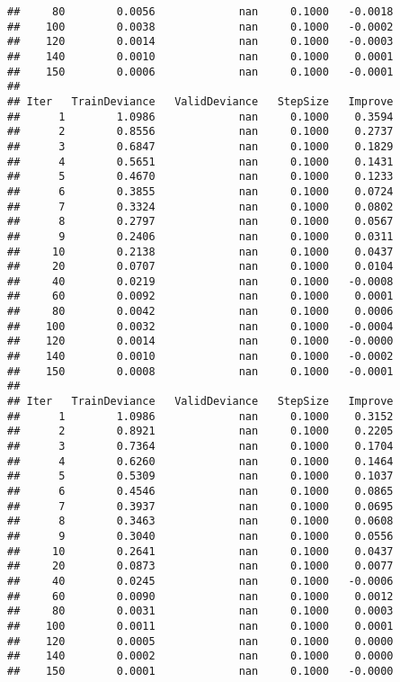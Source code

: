 \documentclass[
]{article}
\begin{document}
\begin{verbatim}
##     80        0.0056             nan     0.1000   -0.0018
##    100        0.0038             nan     0.1000   -0.0002
##    120        0.0014             nan     0.1000   -0.0003
##    140        0.0010             nan     0.1000    0.0001
##    150        0.0006             nan     0.1000   -0.0001
## 
## Iter   TrainDeviance   ValidDeviance   StepSize   Improve
##      1        1.0986             nan     0.1000    0.3594
##      2        0.8556             nan     0.1000    0.2737
##      3        0.6847             nan     0.1000    0.1829
##      4        0.5651             nan     0.1000    0.1431
##      5        0.4670             nan     0.1000    0.1233
##      6        0.3855             nan     0.1000    0.0724
##      7        0.3324             nan     0.1000    0.0802
##      8        0.2797             nan     0.1000    0.0567
##      9        0.2406             nan     0.1000    0.0311
##     10        0.2138             nan     0.1000    0.0437
##     20        0.0707             nan     0.1000    0.0104
##     40        0.0219             nan     0.1000   -0.0008
##     60        0.0092             nan     0.1000    0.0001
##     80        0.0042             nan     0.1000    0.0006
##    100        0.0032             nan     0.1000   -0.0004
##    120        0.0014             nan     0.1000   -0.0000
##    140        0.0010             nan     0.1000   -0.0002
##    150        0.0008             nan     0.1000   -0.0001
## 
## Iter   TrainDeviance   ValidDeviance   StepSize   Improve
##      1        1.0986             nan     0.1000    0.3152
##      2        0.8921             nan     0.1000    0.2205
##      3        0.7364             nan     0.1000    0.1704
##      4        0.6260             nan     0.1000    0.1464
##      5        0.5309             nan     0.1000    0.1037
##      6        0.4546             nan     0.1000    0.0865
##      7        0.3937             nan     0.1000    0.0695
##      8        0.3463             nan     0.1000    0.0608
##      9        0.3040             nan     0.1000    0.0556
##     10        0.2641             nan     0.1000    0.0437
##     20        0.0873             nan     0.1000    0.0077
##     40        0.0245             nan     0.1000   -0.0006
##     60        0.0090             nan     0.1000    0.0012
##     80        0.0031             nan     0.1000    0.0003
##    100        0.0011             nan     0.1000    0.0001
##    120        0.0005             nan     0.1000    0.0000
##    140        0.0002             nan     0.1000    0.0000
##    150        0.0001             nan     0.1000   -0.0000

\end{verbatim}
\end{document}
